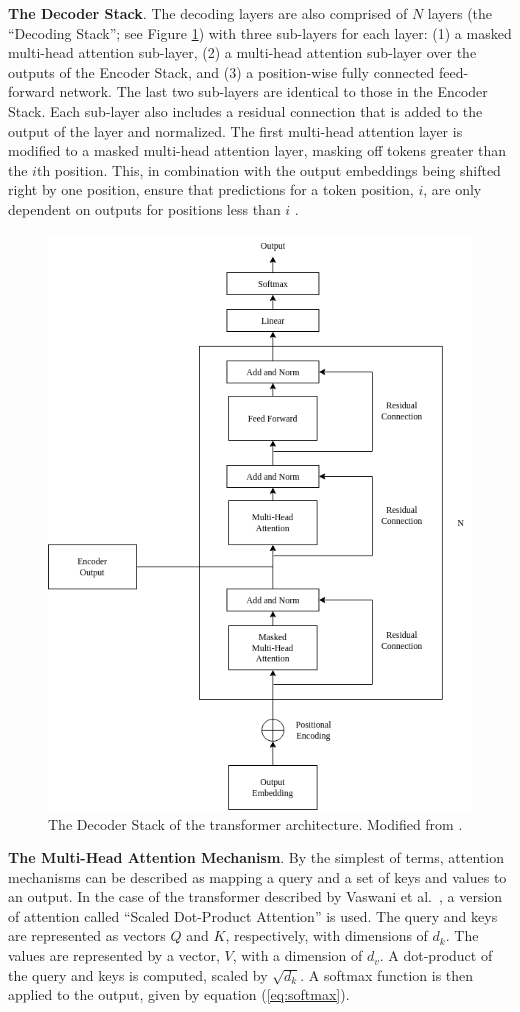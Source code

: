 \documentclass[12pt]{article}
\begin{document}
\textbf{The Decoder Stack}. The decoding layers are also comprised of $N$ layers (the ``Decoding Stack''; see Figure
\ref{fig:transformer_decoder_stack}) with three sub-layers for each layer: (1) a masked multi-head attention sub-layer, (2) a multi-head attention
sub-layer over the outputs of the Encoder Stack, and (3) a position-wise fully connected feed-forward network. The last two sub-layers are identical
to those in the Encoder Stack. Each sub-layer also includes a residual connection that is added to the output of the layer and normalized. The first
multi-head attention layer is modified to a masked multi-head attention layer, masking off tokens greater than the $i$th position. This, in
combination with the output embeddings being shifted right by one position, ensure that predictions for a token position, $i$, are only dependent on
outputs for positions less than $i$ \cite{vaswani_attention_2017}.

\begin{figure}
    \centering
    \includegraphics[width=0.6\linewidth]{figures/transformer_decoder_stack.png}
    \caption{The Decoder Stack of the transformer architecture. Modified from \cite{vaswani_attention_2017}.}
    \label{fig:transformer_decoder_stack}
\end{figure}

\textbf{The Multi-Head Attention Mechanism}. By the simplest of terms, attention mechanisms can be described as mapping a query and a set of keys and
values to an output. In the case of the transformer described by Vaswani et al.~\cite{vaswani_attention_2017}, a version of attention called ``Scaled
Dot-Product Attention'' is used. The query and keys are represented as vectors $Q$ and $K$, respectively, with dimensions of $d_k$. The values are
represented by a vector, $V$, with a dimension of $d_v$. A dot-product of the query and keys is computed, scaled by $\sqrt{d_k}$. A softmax function
is then applied to the output, given by equation (\ref{eq:softmax}).
\end{document}
